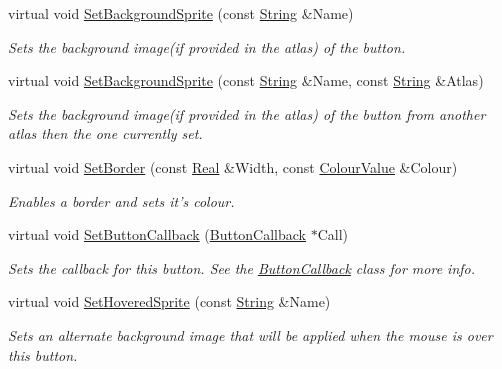 \begin{DoxyCompactItemize}
virtual void \hyperlink{classMezzanine_1_1UI_1_1Button_af34e8bd2454368345da7b23dc17f077c}{SetBackgroundSprite} (const \hyperlink{namespaceMezzanine_acf9fcc130e6ebf08e3d8491aebcf1c86}{String} \&Name)
\begin{DoxyCompactList}\small\item\em Sets the background image(if provided in the atlas) of the button. \item\end{DoxyCompactList}\item 
virtual void \hyperlink{classMezzanine_1_1UI_1_1Button_a27dcfac26f2ace96dcb0e43ce13ed68c}{SetBackgroundSprite} (const \hyperlink{namespaceMezzanine_acf9fcc130e6ebf08e3d8491aebcf1c86}{String} \&Name, const \hyperlink{namespaceMezzanine_acf9fcc130e6ebf08e3d8491aebcf1c86}{String} \&Atlas)
\begin{DoxyCompactList}\small\item\em Sets the background image(if provided in the atlas) of the button from another atlas then the one currently set. \item\end{DoxyCompactList}\item 
virtual void \hyperlink{classMezzanine_1_1UI_1_1Button_a75bad31e5f93373fe1e16761689b354b}{SetBorder} (const \hyperlink{namespaceMezzanine_a726731b1a7df72bf3583e4a97282c6f6}{Real} \&Width, const \hyperlink{classMezzanine_1_1ColourValue}{ColourValue} \&Colour)
\begin{DoxyCompactList}\small\item\em Enables a border and sets it's colour. \item\end{DoxyCompactList}\item 
virtual void \hyperlink{classMezzanine_1_1UI_1_1Button_a0eda9fd6641f9ca52fd5e8e1c3767970}{SetButtonCallback} (\hyperlink{classMezzanine_1_1UI_1_1ButtonCallback}{ButtonCallback} $\ast$Call)
\begin{DoxyCompactList}\small\item\em Sets the callback for this button. See the \hyperlink{classMezzanine_1_1UI_1_1ButtonCallback}{ButtonCallback} class for more info. \item\end{DoxyCompactList}\item 
virtual void \hyperlink{classMezzanine_1_1UI_1_1Button_ad23caa85fbf5ae1c3fc9b5d0873d455b}{SetHoveredSprite} (const \hyperlink{namespaceMezzanine_acf9fcc130e6ebf08e3d8491aebcf1c86}{String} \&Name)
\begin{DoxyCompactList}\small\item\em Sets an alternate background image that will be applied when the mouse is over this button. \item\end{DoxyCompactList}\item 

\end{DoxyCompactItemize}
